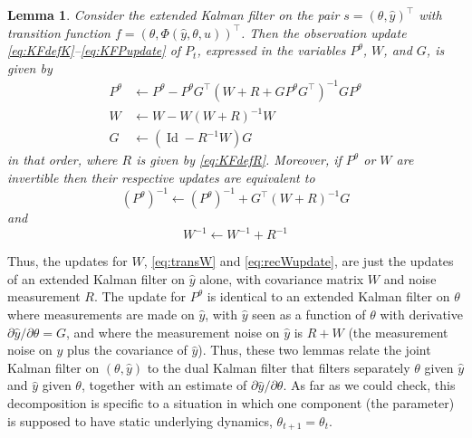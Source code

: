 \documentclass[11pt,a4paper]{article}
\DeclareMathOperator{\Id}{Id}
\newcommand{\1}{\mathbbm{1}}
\theoremstyle{yannthm}
\newtheorem{lem}[defi]{Lemma}
\theoremstyle{yannthm2}
\newcommand{\transp}[1]{#1^{\!\top}\!}
\newcommand{\Ptheta}{P^\theta}
\newcommand{\transf}{\Phi}
\numberwithin{equation}{section}
\begin{document}
\begin{lem}
\label{lem:obsdecomp}
Consider the extended Kalman filter on the pair $s=\transp{(\theta, \hat
y)}$ with
transition function $f=\transp{(\theta,\transf(\hat y,\theta,u))}$. Then
the observation update
\eqref{eq:KFdefK}--\eqref{eq:KFPupdate} of $P_t$, expressed in the
variables $\Ptheta$, $W$, and $G$,
is given by
\begin{align}
\label{eq:recPupdate}
\Ptheta&\gets
\Ptheta-\Ptheta\transp{G}(W+R+G\Ptheta\transp{G})^{-1}G\Ptheta
\\
\label{eq:recWupdate}
W&\gets W-W(W+R)^{-1}W
\\
G&\gets (\Id -R^{-1}W) G
\end{align}
in that order, where $R$ is given by \eqref{eq:KFdefR}. Moreover, if
$\Ptheta$ or $W$ are invertible then their respective updates are
equivalent to
\begin{equation}
\label{eq:recPinvupdate}
(\Ptheta)^{-1}\gets (\Ptheta)^{-1}+\transp{G}(W+R)^{-1}G
\end{equation}
and
\begin{equation}
\label{eq:recWinvupdate}
W^{-1}\gets W^{-1}+R^{-1}
\end{equation}
\end{lem}

Thus, the updates for $W$, \eqref{eq:transW} and \eqref{eq:recWupdate}, 
are just the updates of an extended Kalman
filter on $\hat y$ alone, with covariance matrix $W$ and noise measurement $R$. The update for
$\Ptheta$ is identical to an extended Kalman filter on $\theta$ where
measurements are made on $\hat y$, with $\hat y$ 
seen as a function of $\theta$ with derivative $\partial \hat y/\partial
\theta=G$, and where the measurement noise on $\hat y$ is $R+W$ (the
measurement noise on $y$ plus the covariance of $\hat y$). Thus, these two lemmas relate the joint Kalman filter on
$(\theta,\hat y)$ to the dual Kalman filter that filters separately
$\theta$ given $\hat y$ and $\hat y$ given $\theta$, together with an
estimate of $\partial \hat y/\partial \theta$. As far as we could check,
this decomposition
is specific to a situation in which one component (the parameter) is
supposed to have static underlying dynamics, $\theta_{t+1}=\theta_t$.
\end{document}
